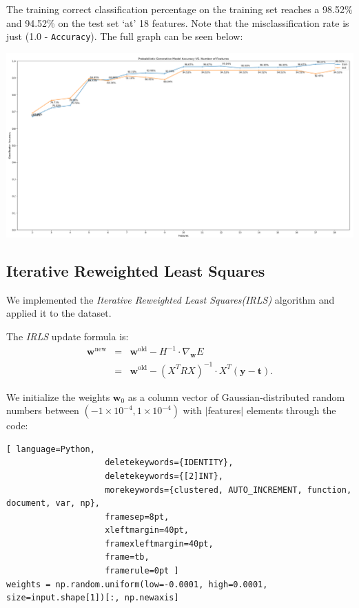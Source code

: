 \documentclass[a4paper,11pt,oneside]{article}
\begin{document}
The training correct classification percentage on the training set reaches a 98.52\% and 94.52\% on the test set `at' 18 features. Note that the misclassification rate is just (1.0 - \texttt{Accuracy}). The full graph can be seen below:

\hspace*{-2cm}\includegraphics[scale=0.35]{pgm.png}

\subsection{Iterative Reweighted Least Squares}

We implemented the \textit{Iterative Reweighted Least Squares(IRLS)} algorithm and applied it to the dataset. 

The \textit{IRLS} update formula is:
\begin{eqnarray*}
\textbf{w}^{\textrm{new}}	&	=	&	\textbf{w}^{\textrm{old}} - H^{-1} \cdot \nabla_{\textbf{w}}E\\
	&	=	&	\textbf{w}^{\textrm{old}} - (X^TRX)^{-1} \cdot X^T(\textbf{y} - \textbf{t})\textrm{.}
\end{eqnarray*}

We initialize the weights $\textbf{w}_0$ as a column vector of Gaussian-distributed random numbers between $(-1\times10^{-4}, 1\times10^{-4})$ with $|$features$|$ elements through the code: 
\begin{lstlisting}[ language=Python,
                    deletekeywords={IDENTITY},
                    deletekeywords={[2]INT},
                    morekeywords={clustered, AUTO_INCREMENT, function, document, var, np},
                    framesep=8pt,
                    xleftmargin=40pt,
                    framexleftmargin=40pt,
                    frame=tb,
                    framerule=0pt ]
weights = np.random.uniform(low=-0.0001, high=0.0001, size=input.shape[1])[:, np.newaxis]
\end{lstlisting}
 	
\end{document}
